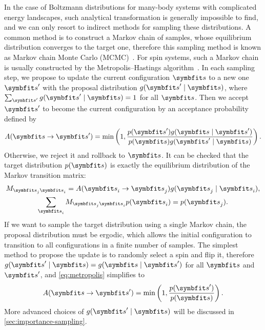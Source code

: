 In the case of Boltzmann distributions for many-body systems with complicated energy landscapes, such analytical transformation is generally impossible to find, and we can only resort to indirect methods for sampling these distributions. A common method is to construct a Markov chain of samples, whose equilibrium distribution converges to the target one, therefore this sampling method is known as Markov chain Monte Carlo (MCMC)~\cite{gelfand1990sampling, robert2020markov}. For spin systems, such a Markov chain is usually constructed by the Metropolis--Hastings algorithm~\cite{hastings1970monte}. In each sampling step, we propose to update the current configuration $\vs$ to a new one $\vs'$ with the proposal distribution $g(\vs' \mid \vs)$, where $\sum_{\vs'} g(\vs' \mid \vs) = 1$ for all $\vs$. Then we accept $\vs'$ to become the current configuration by an acceptance probability defined by
\begin{equation}
A(\vs \to \vs') = \min\left( 1, \frac{p(\vs') g(\vs \mid \vs')}{p(\vs) g(\vs' \mid \vs)} \right).
\label{eq:metropolis}
\end{equation}
Otherwise, we reject it and rollback to $\vs$. It can be checked that the target distribution $p(\vs)$ is exactly the equilibrium distribution of the Markov transition matrix:
\begin{gather}
M_{\vs_j \vs_i} = A(\vs_i \to \vs_j) g(\vs_j \mid \vs_i), \label{eq:markov-matrix} \\
\sum_{\vs_i} M_{\vs_j \vs_i} p(\vs_i) = p(\vs_j).
\end{gather}
If we want to sample the target distribution using a single Markov chain, the proposal distribution must be ergodic, which allows the initial configuration to transition to all configurations in a finite number of samples. The simplest method to propose the update is to randomly select a spin and flip it, therefore $g(\vs' \mid \vs) = g(\vs \mid \vs')$ for all $\vs$ and $\vs'$, and \cref{eq:metropolis} simplifies to
\begin{equation}
A(\vs \to \vs') = \min\left( 1, \frac{p(\vs')}{p(\vs)} \right).
\end{equation}
More advanced choices of $g(\vs' \mid \vs)$ will be discussed in \cref{sec:importance-sampling}.

